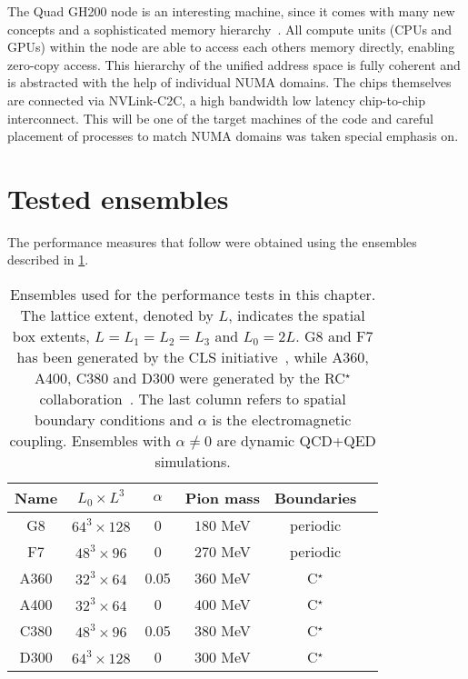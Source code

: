 The Quad GH200 node is an interesting machine, since it comes with many new concepts and a sophisticated memory hierarchy~\cite{fusco2024}.
All compute units (CPUs and GPUs) within the node are able to access each others memory directly, enabling zero-copy access.
This hierarchy of the unified address space is fully coherent and is abstracted with the help of individual NUMA domains.
The chips themselves are connected via NVLink-C2C, a high bandwidth low latency chip-to-chip interconnect.
This will be one of the target machines of the code and careful placement of processes to match NUMA domains was taken special emphasis on.


\section{Tested ensembles}
\label{sec:perf:ensembles}

The performance measures that follow were obtained using the ensembles described in \cref{tab:perf:ensembles}.
\begin{table}[htbp]
\centering
\begin{tabular}{cccccc}
Name & $L_0 \times L^3$  & $\alpha$   & Pion mass & Boundaries \\
\hline
G8   & $64^3 \times 128$ & \num{0}    & $180$ MeV & periodic  \\
F7   & $48^3 \times 96$  & \num{0}    & $270$ MeV & periodic  \\
A360 & $32^3 \times 64$  & \num{0.05} & $360$ MeV & C$^\star$ \\
A400 & $32^3 \times 64$  & \num{0}    & $400$ MeV & C$^\star$ \\
C380 & $48^3 \times 96$  & \num{0.05} & $380$ MeV & C$^\star$ \\
D300 & $64^3 \times 128$ & \num{0}    & $300$ MeV & C$^\star$
\end{tabular}
\caption{
Ensembles used for the performance tests in this chapter.
The lattice extent, denoted by $L$, indicates the spatial box extents, $L = L_1 = L_2 = L_3$ and $L_0 = 2L$.
G8 and F7 has been generated by the CLS initiative~\cite{online:cls}, while A360, A400, C380 and D300 were generated by the RC$^\star$ collaboration~\cite{RCstar22}.
The last column refers to spatial boundary conditions and $\alpha$ is the electromagnetic coupling.
Ensembles with $\alpha \neq 0$ are dynamic QCD+QED simulations.}
\label{tab:perf:ensembles}
\end{table}

